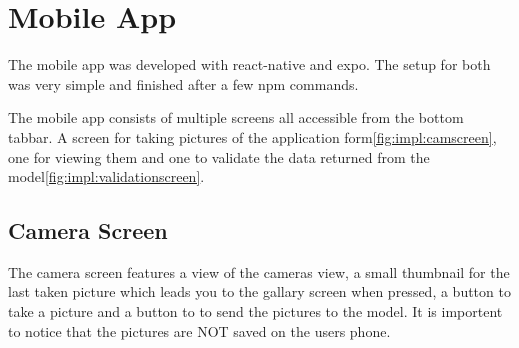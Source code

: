 %
%
%
%
%
%
%
%



\section{Mobile App}

The mobile app was developed with react-native and expo. 
The setup for both was very simple and finished after a few npm commands.

The mobile app consists of multiple screens all accessible from the bottom tabbar.
A screen for taking pictures of the application form\ref{fig:impl:camscreen}, one for viewing them 
and one to validate the data returned from the model\ref{fig:impl:validationscreen}.

\subsection{Camera Screen}

The camera screen features a view of the cameras view,
a small thumbnail for the last taken picture which leads you to the gallary screen when pressed,
a button to take a picture and a button to to send the pictures to the model.
It is importent to notice that the pictures are NOT saved on the users phone.

